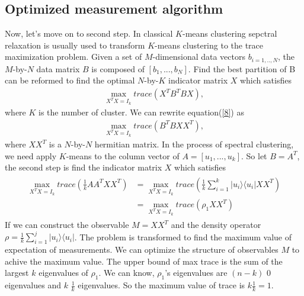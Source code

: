 \documentclass[twocolumn,notitlepage]{revtex4-1}
\def\ket#1{| #1 \rangle}
\def\bra#1{\langle #1 |}
\begin{document}
\subsection{Optimized measurement algorithm}
Now, let's move on to second step. In classical $K$-means clustering sepctral relaxation is usually used to transform $K$-means clustering to the trace maximization problem. Given a set of $M$-dimensional data vectors $b_{i=1,..,N}$, the $M$-by-$N$ data matrix $B$ is composed of $[b_{1},...,b_{N}]$. Find the best partition of B can be reformed to find the optimal $N$-by-$K$ indicator matrix $X$ which satisfies
\begin{align}
    \max_{X^TX=I_{k}} trace(X^TB^TBX),\label{8}
\end{align}
where $K$ is the number of cluster. We can rewrite equation(\ref{8}) as 
\begin{align}
    \max_{X^TX=I_{k}} trace(B^TBXX^T),
\end{align}
where $XX^T$ is a $N$-by-$N$ hermitian matrix. In the process of spectral clustering, we need apply $K$-means to the column vector of $A=[u_{1},...,u_{k}]$. So let $B=A^T$, the second step is find the indicator matrix $X$ which satisfies
\begin{align}
    \begin{split}
        \max_{X^TX=I_{k}} trace(\frac{1}{k}AA^TXX^T)&=\max_{X^TX=I_{k}} trace(\frac{1}{k}\sum_{i=1}^{k}\ket{u_{i}}\bra{u_{i}} XX^T)\\
        &=\max_{X^TX=I_{k}} trace(\rho_{1} XX^T)
    \end{split}
\end{align} 
If we can construct the observable $M=XX^T$ and the density operator $\rho = \frac{1}{k}\sum_{i=1}^{j}\ket{u_{i}}\bra{u_{i}}$. The problem is transformed to find the maximum value of expectation of measurements. We can optimize the structure of observables $M$ to achive the maximum value. The upper bound of max trace is the sum of the largest $k$ eigenvalues of $\rho_{1}$. We can know, $\rho_{1}$'s eigenvalues are $(n-k)$ 0 eigenvalues and $k$ $\frac{1}{k}$ eigenvalues. So the maximum value of trace is $k\frac{1}{k}=1$.
\end{document}
